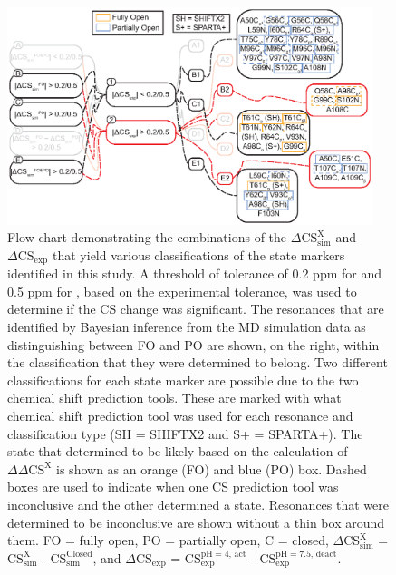\documentclass[%
 aip,
 amsmath,amssymb,
 preprint,%
]{revtex4-1}
\begin{document}
\begin{figure}[tbp]
\includegraphics[width=0.95\textwidth]{figures_SI/SI_Markers_FlowChart_v4-04.eps}
\caption{\label{SI_FlowChart} \scriptsize
    Flow chart demonstrating the combinations of the $\Delta\text{CS}_{\text{sim}}^{\text{X}}$ and $\Delta\text{CS}_{\text{exp}}$ that yield various classifications of the state markers identified in this study. A threshold of tolerance of 0.2 ppm for  and 0.5 ppm for , based on the experimental tolerance, was used to determine if the CS change was significant. The resonances that are identified by Bayesian inference from the MD simulation data as distinguishing between FO and PO are shown, on the right, within the classification that they were determined to belong. Two different classifications for each state marker are possible due to the two chemical shift prediction tools. These are marked with what chemical shift prediction tool was used for each resonance and classification type (SH = SHIFTX2 and S+ = SPARTA+). The state that determined to be likely based on the calculation of $\Delta\Delta\text{CS}^{\text{X}}$ is shown as an orange (FO) and blue (PO) box. Dashed boxes are used to indicate when one CS prediction tool was inconclusive and the other determined a state. Resonances that were determined to be inconclusive are shown without a thin box around them. FO = fully open, PO = partially open, C = closed, $\Delta\text{CS}_{\text{sim}}^{\text{X}}$ = $\text{CS}_{\text{sim}}^{\text{X}}$ - $\text{CS}_{\text{sim}}^{\text{Closed}}$, and $\Delta\text{CS}_{\text{exp}}$ = $\text{CS}_{\text{exp}}^{\text{pH}=4\text{, act}}$ - $\text{CS}_{\text{exp}}^{\text{pH}=7.5\text{, deact}}$.}
\end{figure}
\clearpage
\end{document}
